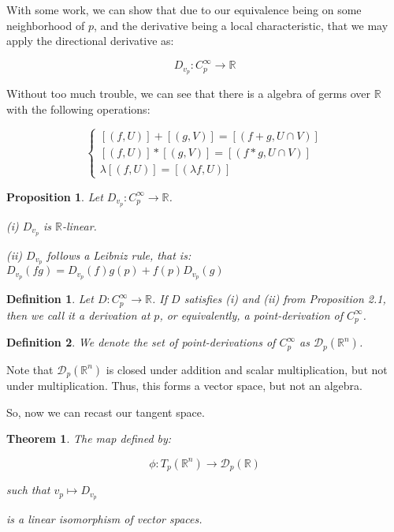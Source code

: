\documentclass[10pt]{article}
\newtheorem{definition}{Definition}[section]
\newtheorem{theorem}{Theorem}[section]
\newtheorem{proposition}{Proposition}[section]
\begin{document}
With some work, we can show that due to our equivalence being on some neighborhood of $p$, and the derivative being a local characteristic, that we may apply the directional derivative as:

$$ D_{v_p}: C^\infty_p \to \mathbb{R}$$

Without too much trouble, we can see that there is a algebra of germs over $\mathbb{R}$ with the following operations:

$$ \begin{cases} [(f,U)] + [(g,V)] = [(f+g, U \cap V)] \\ [(f,U)] * [(g,V)] = [(f*g, U \cap V)] \\ \lambda[(f,U)] = [(\lambda f, U )] \end{cases} $$

\begin{proposition}
Let $D_{v_p} : C_p^\infty \to \mathbb{R}$.

(i) $D_{v_p}$ is $\mathbb{R}$-linear.

(ii) $D_{v_p}$ follows a Leibniz rule, that is: $D_{v_p}(fg) = D_{v_p}(f) g(p) + f(p) D_{v_p}(g) $


\end{proposition}

\begin{definition}
Let $D: C^\infty_p \to \mathbb{R}$. If $D$ satisfies (i) and (ii) from Proposition 2.1, then we call it a derivation at $p$, or equivalently, a point-derivation of $C^\infty_p$. 
\end{definition}

\begin{definition}
We denote the set of point-derivations of $C_p^\infty$ as $\mathcal{D}_p(\mathbb{R}^n)$.
\end{definition}

Note that $\mathcal{D}_p(\mathbb{R}^n)$ is closed under addition and scalar multiplication, but not under multiplication. Thus, this forms a vector space, but not an algebra.

So, now we can recast our tangent space.

\begin{theorem}

The map defined by: 

$$ \phi: T_p(\mathbb{R}^n) \to \mathcal{D}_p(\mathbb{R}) $$

such that $v_p \mapsto D_{v_p}$

is a linear isomorphism of vector spaces.

\end{theorem}
\end{document}
